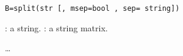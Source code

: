 
\begin{mandesc}
\end{mandesc}
\begin{calling_sequence}
\begin{verbatim}
B=split(str [, msep=bool , sep= string]) 
\end{verbatim}
\end{calling_sequence}

\begin{parameters}
  \begin{varlist}
     : a string.
     : a string matrix.
  \end{varlist}
\end{parameters}

\begin{mandescription}
\ldots 
\end{mandescription}


